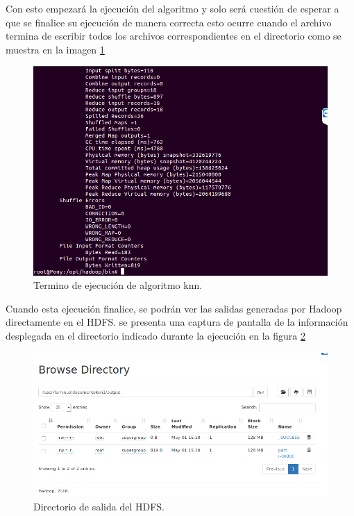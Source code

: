 Con esto empezará la ejecución del algoritmo y solo será cuestión de esperar a que se finalice su ejecución de manera correcta esto ocurre cuando el archivo termina de escribir todos los archivos correspondientes en el directorio como se muestra en la imagen \ref{fig:finknn1}
\begin{figure}[H]
	\begin{center}
		\hypertarget{fig:finknn1}{\hspace{1pt}}
		\includegraphics[width=.9\textwidth]{capitulo4a/images/corrida3.png}
		\caption{Termino de ejecución de algoritmo knn.}
		\label{fig:finknn1}
	\end{center}
\end{figure}
Cuando esta ejecución finalice, se podrán ver las salidas generadas por Hadoop directamente en el HDFS. se presenta una captura de pantalla de la información desplegada en el directorio indicado durante la ejecución en la figura \ref{fig:directorio}
\begin{figure}[H]
	\begin{center}
		\hypertarget{fig:directorio}{\hspace{1pt}}
		\includegraphics[width=.9\textwidth]{capitulo4a/images/corrida4.png}
		\caption{Directorio de salida del HDFS.}
		\label{fig:directorio}
	\end{center}
\end{figure}
